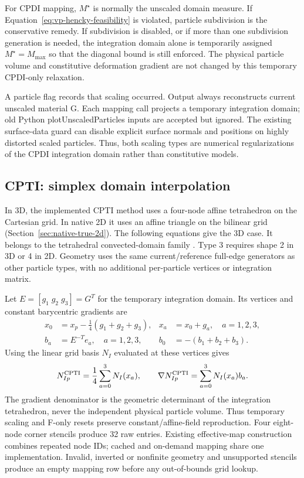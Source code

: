 For CPDI mapping, $M^{\star}$ is normally the unscaled domain measure.  If Equation~\eqref{eq:vp-hencky-feasibility} is violated, particle subdivision is the conservative remedy.  If subdivision is disabled, or if more than one subdivision generation is needed, the integration domain alone is temporarily assigned $M^{\star}=M_{\max}$ so that the diagonal bound is still enforced.  The physical particle volume and constitutive deformation gradient are not changed by this temporary CPDI-only relaxation.

A particle flag records that scaling occurred.  Output always reconstructs current unscaled material G. Each mapping call projects a temporary integration domain; old Python plotUnscaledParticles inputs are accepted but ignored.  The existing surface-data guard can disable explicit surface normals and positions on highly distorted scaled particles.  Thus, both scaling types are numerical regularizations of the CPDI integration domain rather than constitutive models.

\subsection{CPTI: simplex domain interpolation}
\label{subsec:cpti-cpdi2-placeholders}

In 3D, the implemented CPTI method uses a four-node affine tetrahedron on the
Cartesian grid. In native 2D it uses an affine triangle on the bilinear grid
(Section~\ref{sec:native-true-2d}). The following equations give the 3D case. It belongs to the tetrahedral convected-domain family
\cite{leavy2019cpti,noh2026cpdi}. Type 3 requires shape 2 in 3D or 4 in 2D. Geometry uses
the same current/reference full-edge generators as other particle types, with
no additional per-particle vertices or integration matrix.

Let $E=[g_1\;g_2\;g_3]=G^T$ for the temporary integration domain. Its vertices
and constant barycentric gradients are
\begin{align}
 x_0 &= x_p-\tfrac14(g_1+g_2+g_3), & x_a &= x_0+g_a,\quad a=1,2,3,\\
 b_a &= E^{-T}e_a,\quad a=1,2,3, & b_0 &= -(b_1+b_2+b_3).
\end{align}
Using the linear grid basis $N_I$ evaluated at these vertices gives
\begin{equation}
 N_{Ip}^{\rm CPTI}=\frac14\sum_{a=0}^{3}N_I(x_a),\qquad
 \nabla N_{Ip}^{\rm CPTI}=\sum_{a=0}^{3}N_I(x_a)b_a.
\end{equation}
The gradient denominator is the geometric determinant of the integration
tetrahedron, never the independent physical particle volume. Thus temporary
scaling and F-only resets preserve constant/affine-field reproduction. Four
eight-node corner stencils produce 32 raw entries. Existing effective-map
construction combines repeated node IDs; cached and on-demand mapping share
one implementation. Invalid, inverted or nonfinite geometry and unsupported
stencils produce an empty mapping row before any out-of-bounds grid lookup.

